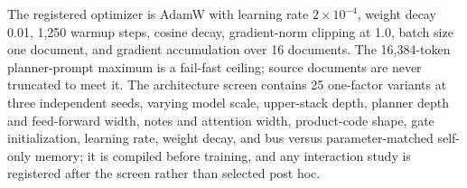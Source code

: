 \documentclass[10pt]{article}
\begin{document}
The registered optimizer is AdamW with learning rate \(2\times10^{-4}\),
weight decay 0.01, 1,250 warmup steps, cosine decay, gradient-norm clipping
at 1.0, batch size one document, and gradient accumulation over 16
documents. The 16,384-token planner-prompt maximum is a fail-fast ceiling;
source documents are never truncated to meet it. The architecture screen
contains 25 one-factor variants at three independent seeds, varying model
scale, upper-stack depth, planner depth and feed-forward width, notes and
attention width, product-code shape, gate initialization, learning rate,
weight decay, and bus versus parameter-matched self-only memory; it is
compiled before training, and any interaction study is registered after the
screen rather than selected post hoc.



\end{document}
